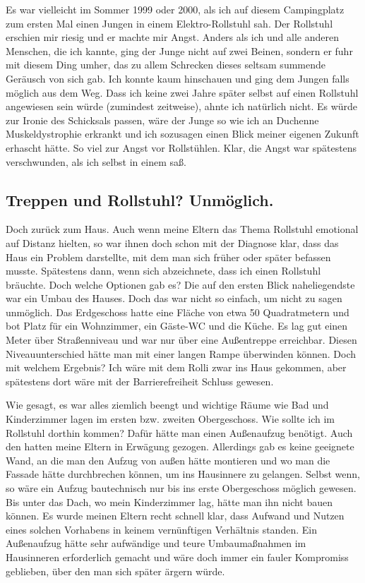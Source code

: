 \documentclass[fontsize=14pt,a4paper,headinclude,DIV=calc,automark]{scrbook}
\begin{document}
Es war vielleicht im Sommer 1999 oder 2000, als ich auf diesem Campingplatz zum ersten Mal einen Jungen in einem Elektro-Rollstuhl sah. Der Rollstuhl erschien mir riesig und er machte mir Angst. Anders als ich und alle anderen Menschen, die ich kannte, ging der Junge nicht auf zwei Beinen, sondern er fuhr mit diesem Ding umher, das zu allem Schrecken dieses seltsam summende Geräusch von sich gab. Ich konnte kaum hinschauen und ging dem Jungen falls möglich aus dem Weg. Dass ich keine zwei Jahre später selbst auf einen Rollstuhl angewiesen sein würde (zumindest zeitweise), ahnte ich natürlich nicht. Es würde zur Ironie des Schicksals passen, wäre der Junge so wie ich an Duchenne Muskeldystrophie erkrankt und ich sozusagen einen Blick meiner eigenen Zukunft erhascht hätte. So viel zur Angst vor Rollstühlen. Klar, die Angst war spätestens verschwunden, als ich selbst in einem saß.

\subsection{Treppen und Rollstuhl? Unmöglich.}

Doch zurück zum Haus. Auch wenn meine Eltern das Thema Rollstuhl emotional auf Distanz hielten, so war ihnen doch schon mit der Diagnose klar, dass das Haus ein Problem darstellte, mit dem man sich früher oder später befassen musste. Spätestens dann, wenn sich abzeichnete, dass ich einen Rollstuhl bräuchte.
Doch welche Optionen gab es? Die auf den ersten Blick naheliegendste war ein Umbau des Hauses. Doch das war nicht so einfach, um nicht zu sagen unmöglich. Das Erdgeschoss hatte eine Fläche von etwa 50 Quadratmetern und bot Platz für ein Wohnzimmer, ein Gäste-WC und die Küche. Es lag gut einen Meter über Straßenniveau und war nur über eine Außentreppe erreichbar. Diesen Niveauunterschied hätte man mit einer langen Rampe überwinden können. Doch mit welchem Ergebnis? Ich wäre mit dem Rolli zwar ins Haus gekommen, aber spätestens dort wäre mit der Barrierefreiheit Schluss gewesen.

Wie gesagt, es war alles ziemlich beengt und wichtige Räume wie Bad und Kinderzimmer lagen im ersten bzw. zweiten Obergeschoss. Wie sollte ich im Rollstuhl dorthin kommen? Dafür hätte man einen Außenaufzug benötigt. Auch den hatten meine Eltern in Erwägung gezogen. Allerdings gab es keine geeignete Wand, an die man den Aufzug von außen hätte montieren und wo man die Fassade hätte durchbrechen können, um ins Hausinnere zu gelangen. Selbst wenn, so wäre ein Aufzug bautechnisch nur bis ins erste Obergeschoss möglich gewesen. Bis unter das Dach, wo mein Kinderzimmer lag, hätte man ihn nicht bauen können. Es wurde meinen Eltern recht schnell klar, dass Aufwand und Nutzen eines solchen Vorhabens in keinem vernünftigen Verhältnis standen. Ein Außenaufzug hätte sehr aufwändige und teure Umbaumaßnahmen im Hausinneren erforderlich gemacht und wäre doch immer ein fauler Kompromiss geblieben, über den man sich später ärgern würde.
\end{document}
